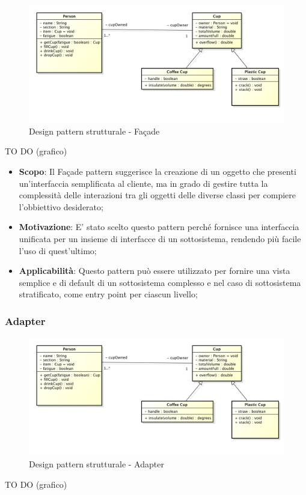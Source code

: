 		
		\begin{figure}[htbp]
			\centering
			\centerline{\includegraphics[scale=0.3]{./images/example_graph.png}}
			\caption{Design pattern strutturale - Fa\c{c}ade}
		\end{figure}
		TO DO (grafico)
		
		
		\begin{itemize}
			\item \textbf{Scopo}: Il Fa\c{c}ade pattern suggerisce la creazione di un oggetto che presenti un'interfaccia semplificata al cliente, ma in grado di gestire tutta la complessità delle interazioni tra gli oggetti delle diverse classi per compiere l'obbiettivo desiderato;
			
			\item \textbf{Motivazione}: E' stato scelto questo pattern perché fornisce una interfaccia unificata per un insieme di interfacce di un sottosistema, rendendo più facile l'uso di quest'ultimo;
			
			\item \textbf{Applicabilità}: Questo pattern può essere utilizzato per fornire una vista semplice e di default di un sottosistema complesso e nel caso di sottosistema stratificato, come entry point per ciascun livello;
			
		\end{itemize}
		
		\subsubsection{Adapter} %
		
		
		\begin{figure}[htbp]
			\centering
			\centerline{\includegraphics[scale=0.3]{./images/example_graph.png}}
			\caption{Design pattern strutturale - Adapter}
		\end{figure}
		TO DO (grafico)
		
